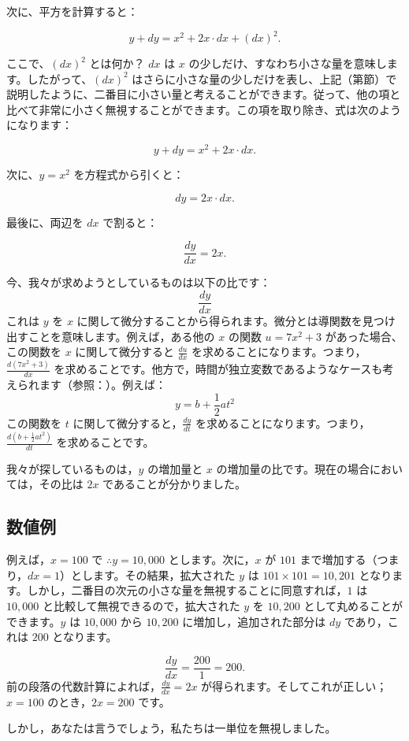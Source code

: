\documentclass[a4paper,11pt,openany]{ltjsbook}
\begin{document}
次に、平方を計算すると：

\[
y + dy = x^2 + 2x \cdot dx + (dx)^2.
\]

ここで、\( (dx)^2 \) とは何か？ \( dx \) は \( x \) の少しだけ、すなわち小さな量を意味します。したがって、\( (dx)^2 \) はさらに小さな量の少しだけを表し、上記（第\pageref{smallness}節）で説明したように、二番目に小さい量と考えることができます。従って、他の項と比べて非常に小さく無視することができます。この項を取り除き、式は次のようになります：

\[
y + dy = x^2 + 2x \cdot dx.
\]

次に、\( y = x^2 \) を方程式から引くと：

\[
dy = 2x \cdot dx.
\]

最後に、両辺を \( dx \) で割ると：

\[
\dfrac{dy}{dx} = 2x.
\]

今、我々が求めようとしているものは以下の比です：
$$\frac{dy}{dx}$$
これは $y$ を $x$ に関して微分することから得られます。微分とは導関数を見つけ出すことを意味します。例えば，ある他の $x$ の関数 $u = 7x^2 + 3$ があった場合、この関数を $x$ に関して微分すると $\frac{du}{dx}$ を求めることになります。つまり，$\frac{d(7x^2 + 3)}{dx}$ を求めることです。他方で，時間が独立変数であるようなケースも考えられます（参照：\pageref{indvar}）。例えば：
$$y = b + \frac{1}{2} at^2$$
この関数を $t$ に関して微分すると，$\frac{dy}{dt}$ を求めることになります。つまり，$\frac{d(b + \frac{1}{2} at^2)}{dt}$ を求めることです。

我々が探しているものは，$y$ の増加量と $x$ の増加量の比です。現在の場合においては，その比は $2x$ であることが分かりました。

\subsection*{数値例}
例えば，$x = 100$ で $\therefore y = 10,000$ とします。次に，$x$ が $101$ まで増加する（つまり，$dx = 1$）とします。その結果，拡大された $y$ は $101 \times 101 = 10,201$ となります。しかし，二番目の次元の小さな量を無視することに同意すれば，$1$ は $10,000$ と比較して無視できるので，拡大された $y$ を $10,200$ として丸めることができます。$y$ は $10,000$ から $10,200$ に増加し，追加された部分は $dy$ であり，これは $200$ となります。

$$\frac{dy}{dx} = \frac{200}{1} = 200.$$ 前の段落の代数計算によれば，$\frac{dy}{dx} = 2x$ が得られます。そしてこれが正しい；$x = 100$ のとき，$2x = 200$ です。

しかし，あなたは言うでしょう，私たちは一単位を無視しました。
\end{document}
